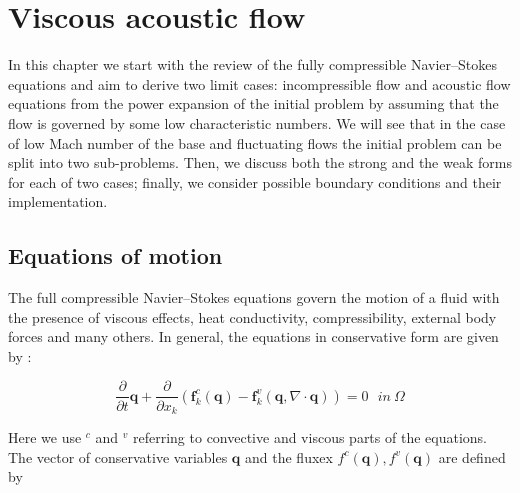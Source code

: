 
\chapter{Viscous acoustic flow}  %

\ifpdf
    \graphicspath{{Chapter1/Figs/Raster/}{Chapter1/Figs/PDF/}{Chapter1/Figs/}}
\else
    \graphicspath{{Chapter1/Figs/Vector/}{Chapter1/Figs/}}
\fi

In this chapter we start with the review of the fully compressible Navier--Stokes equations and aim to derive two limit cases: incompressible flow and acoustic flow equations from the power expansion of the initial problem by assuming that the flow is governed by some low characteristic numbers. We will see that in the case of low Mach number of the base and fluctuating flows the initial problem can be split into two sub-problems. Then, we discuss both the strong and the weak forms for each of two cases; finally, we consider possible boundary conditions and their implementation.

\section{Equations of motion}

The full compressible Navier--Stokes equations govern the motion of a fluid with the presence of viscous effects, heat conductivity, compressibility, external body forces and many others. In general, the equations in conservative form are given by \cite{LandauHydro}:

\begin{equation}
\label{eq:cNSPrimForm}
    \frac{\partial}{\partial t} \textbf{q} + \frac{\partial}{\partial x_k} \left( \textbf{f}^c_k(\textbf{q}) -  \textbf{f}^v_k(\textbf{q}, \nabla \cdot \textbf{q}) \right) = 0 \ \  \ in  \ \Omega
\end{equation}

Here we use $^c$ and $^v$ referring to convective and viscous parts of the equations. The vector of conservative variables $\textbf{q}$ and the fluxex $f^c(\textbf{q}), f^v(\textbf{q})$ are defined by

